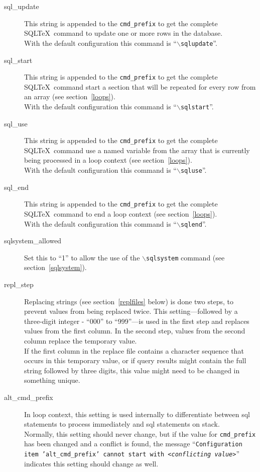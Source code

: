 \documentclass{article}
\newcommand{\bs}{\ensuremath{\backslash}}
\begin{document}
\begin{description}
\item[sql\_update] This string is appended to the \texttt{cmd\_prefix}
to get the complete SQL\TeX\ command to update one or more rows in the database.\\
With the default configuration this command is ``\texttt{\bs sqlupdate}''.

\item[sql\_start] This string is appended to the \texttt{cmd\_prefix} to get the complete SQL\TeX\ command start a section that will be repeated for every row from an array (see section~\ref{loops}).\\
With the default configuration this command is ``\texttt{\bs sqlstart}''.

\item[sql\_use] This string is appended to the \texttt{cmd\_prefix} to get the complete SQL\TeX\ command use a named variable from the array that is currently being processed in a loop context (see section~\ref{loops}).\\
With the default configuration this command is ``\texttt{\bs sqluse}''.

\item[sql\_end] This string is appended to the \texttt{cmd\_prefix} to get the complete SQL\TeX\ command to end a loop context (see section~\ref{loops}).\\
With the default configuration this command is ``\texttt{\bs sqlend}''.

\item[sqlsystem\_allowed] Set this to ``1'' to allow the use of the \texttt{\bs sqlsystem} command (see section~\ref{sqlsystem}).

\item[repl\_step] Replacing strings (see section~\ref{replfiles} below) is done two steps, to prevent values from being replaced twice.
This setting---followed by a three-digit integer - ``000'' to ``999''---is used in the first step and replaces values from the first column.
In the second step, values from the second column replace the temporary value. \\
If the first column in the replace file contains a character sequence that occurs in this temporary value, or if query results might contain the full string followed by three digits, this value might need to be changed in something unique.

\item[alt\_cmd\_prefix] In loop context, this setting is used internally to differentiate between sql statements to process immediately and sql statements on stack.\\
Normally, this setting should never change, but if the value for \texttt{cmd\_prefix} has been changed and a conflict is found, the message ``\texttt{Configuration item 'alt\_cmd\_prefix' cannot start with \textit{<conflicting value>}}'' indicates this setting should change as well.

\end{description}
\end{document}
